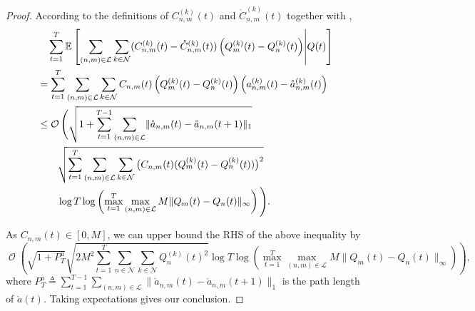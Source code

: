 \documentclass[11pt,fullpage,letterpaper]{article} %
\renewcommand{\bm}[1]{#1}%
\renewcommand{\O}{\operatorname{\mathcal O}}
\newcommand{\E}{\operatornamewithlimits{\mathbb{E}}}
\newcommand{\mN}{{\mathcal N}}
\newcommand{\mL}{{\mathcal L}}
\begin{document}
\begin{proof}
According to the definitions of $C_{n,m}^{(k)}(t)$ and $\mathring C_{n,m}^{(k)}(t)$ together with ,
\begin{align*}
&\quad \sum_{t=1}^T \E\left [\sum_{(n,m)\in \mL} \sum_{k\in \mN} (C_{n,m}^{(k)}(t)-\mathring{C}_{n,m}^{(k)}(t))\left (Q_m^{(k)}(t)-Q_n^{(k)}(t)\right )\middle \vert \bm Q(t)\right ] \\
&=\sum_{t=1}^T \sum_{(n,m)\in \mL} \sum_{k\in \mN} C_{n,m}(t)\left (Q_m^{(k)}(t) - Q_n^{(k)}(t)\right ) \left (a_{n,m}^{(k)}(t)-\mathring a_{n,m}^{(k)}(t)\right )\\
&\le \O\Bigg (\sqrt{1+\sum_{t=1}^{T-1} \sum_{(n,m)\in \mL} \lVert \mathring{\bm a}_{n,m}(t) - \mathring{\bm a}_{n,m}(t+1)\rVert_1}\\
&\qquad \sqrt{\sum_{t=1}^T \sum_{(n,m)\in \mL}\sum_{k\in \mN} \big (C_{n,m}(t)(Q_m^{(k)}(t)-Q_n^{(k)}(t))\big )^2}\\
&\qquad \log T \log \left (\max_{t=1}^T \max_{(n,m)\in \mL} M \lVert \bm Q_m(t) - \bm Q_n(t)\rVert_\infty\right )\Bigg ).
\end{align*}

As $C_{n,m}(t)\in [0,M]$, we can upper bound the RHS of the above inequality by
\begin{equation*}
\O\left (\sqrt{1+P_T^a} \sqrt{2M^2 \sum_{t=1}^T \sum_{n\in \mN}\sum_{k\in \mN} Q_n^{(k)}(t)^2}\log T \log \left (\max_{t=1}^T \max_{(n,m)\in \mL} M \lVert \bm Q_m(t) - \bm Q_n(t)\rVert_\infty\right )\right ),
\end{equation*}
where $P_T^a\triangleq \sum_{t=1}^{T-1} \sum_{(n,m)\in \mL} \lVert \mathring{\bm a}_{n,m}(t) - \mathring{\bm a}_{n,m}(t+1)\rVert_1$ is the path length of $\mathring{\bm a}(t)$. Taking expectations gives our conclusion.
\end{proof}
\end{document}
